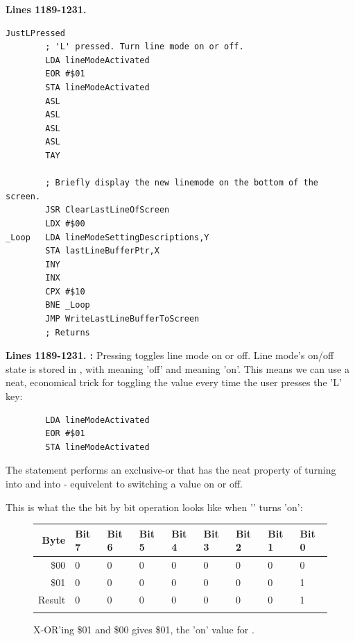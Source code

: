 \clearpage
\textbf{Lines 1189-1231. } 
\begin{lstlisting}[caption=From \icode{CheckKeyboardInput}.]
JustLPressed   
        ; 'L' pressed. Turn line mode on or off.
        LDA lineModeActivated
        EOR #$01
        STA lineModeActivated
        ASL 
        ASL 
        ASL 
        ASL 
        TAY 

        ; Briefly display the new linemode on the bottom of the screen.
        JSR ClearLastLineOfScreen
        LDX #$00
_Loop   LDA lineModeSettingDescriptions,Y
        STA lastLineBufferPtr,X
        INY 
        INX 
        CPX #$10
        BNE _Loop
        JMP WriteLastLineBufferToScreen
        ; Returns
\end{lstlisting}

\clearpage

\textbf{Lines 1189-1231. :} 
Pressing  toggles line mode on or off. Line mode's on/off state is 
stored in , with  meaning 'off' and
 meaning 'on'. This means we can use a neat, economical trick
for toggling the value every time the user presses the 'L' key:

\begin{lstlisting}
        LDA lineModeActivated
        EOR #$01
        STA lineModeActivated
\end{lstlisting}

The  statement performs an exclusive-or that has the neat property of
turning  into  and  into  - equivelent
to switching a value on or off.

This is what the the bit by bit operation looks like when '' turns
 'on':

\begin{figure}[H]
  {
    \setlength{\tabcolsep}{3.0pt}
    \setlength\cmidrulewidth{\heavyrulewidth} %
    \begin{adjustbox}{width=7cm,center}

      \begin{tabular}{rllllllll}
        \toprule
        Byte & Bit 7 & Bit 6 & Bit 5 & Bit 4 & Bit 3 & Bit 2 & Bit 1 & Bit 0        \\
        \midrule
        \$00 & 0 & 0 & 0 & 0 & 0 & 0 & 0 & 0 \\
        \$01 & 0 & 0 & 0 & 0 & 0 & 0 & 0 & 1 \\
        \midrule
        Result & 0 & 0 & 0 & 0 & 0 & 0 & 0 & 1 \\
        \addlinespace
        \bottomrule
      \end{tabular}

    \end{adjustbox}

  }\caption*{X-OR'ing \$01 and \$00 gives \$01, the 'on' value for .}
\end{figure}

